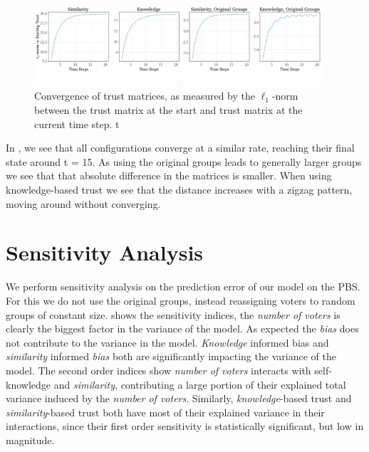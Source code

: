 \begin{figure}[h]
	\begin{center}
		\includegraphics[width=0.95\textwidth]{Figures/convergence_groups.png}
	\end{center}
	\caption{Convergence of trust matrices, as measured by the $\ell_1$-norm between the trust matrix at the start and  trust matrix at the current time step.
		t}\label{fig:convergence_big}
\end{figure}

In , we see that all configurations converge at a similar rate, reaching their final state around t = 15. As using the original groups leads to generally larger groups we see that that absolute difference in the matrices is smaller. When using knowledge-based trust we see that the distance increases with a zigzag pattern, moving around without converging.





\section{Sensitivity Analysis} We perform sensitivity analysis on the
prediction error of our model on the PBS. For this we do not use the original
groups, instead reassigning voters to random groups of constant size.
 shows the sensitivity indices, the \textit{number of voters}
is clearly the biggest factor in the variance of the model. As expected the
\textit{bias} does not contribute to the variance in the model. \textit{Knowledge} informed bias
and\textit{ similarity} informed \textit{bias} both are significantly impacting the variance of
the model. The second order indices show \textit{number of voters} interacts with
self-knowledge and\textit{ similarity}, contributing a large portion of their explained
total variance induced by the \textit{number of voters}. Similarly,\textit{ knowledge}-based
trust and\textit{ similarity}-based trust both have most of their explained variance in
their interactions, since their first order sensitivity is statistically
significant, but low in magnitude.



